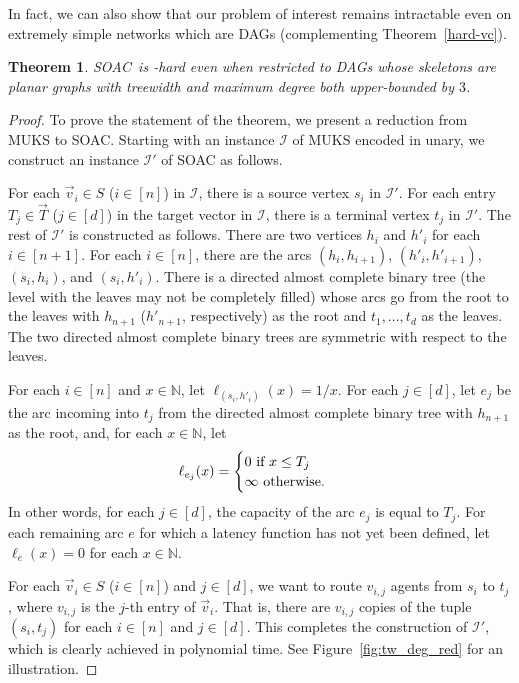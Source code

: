 \documentclass[letterpaper]{article} %
\newtheorem{theorem}{Theorem}
\newcommand{\problem}{{\sc SOAC}\xspace} %
\begin{document}
In fact, we can also show that our problem of interest remains intractable even on extremely simple networks which are DAGs (complementing Theorem~\ref{hard-vc}).

\begin{theorem}
\label{hard-tw-delta}
\problem\ is \NP-hard even when restricted to DAGs whose skeletons are planar graphs with treewidth and maximum degree both upper-bounded by $3$.
\end{theorem}

\begin{proof}
To prove the statement of the theorem, we present a reduction from \textsc{MUKS} to \problem.
Starting with an instance $\mathcal{I}$ of \textsc{MUKS} encoded in unary, we construct an instance $\mathcal{I}'$ of \problem{} as follows.

For each $\vec v_i \in S$ ($i\in [n]$) in $\mathcal{I}$, there is a source vertex $s_i$ in $\mathcal{I}'$.
For each entry $T_j\in \vec T$ ($j\in [d]$) in the target vector in $\mathcal{I}$, there is a terminal vertex $t_j$ in $\mathcal{I}'$.
The rest of $\mathcal{I}'$ is constructed as follows.
There are two vertices $h_i$ and $h'_i$ for each $i\in [n+1]$.
For each $i\in [n]$, there are the arcs $(h_i,h_{i+1})$, $(h'_i,h'_{i+1})$, $(s_i,h_i)$, and $(s_i,h'_i)$.
There is a directed almost complete binary tree (the level with the leaves may not be completely filled) whose arcs go from the root to the leaves with $h_{n+1}$ ($h'_{n+1}$, respectively) as the root and $t_1,\ldots,t_d$ as the leaves.
The two directed almost complete binary trees are symmetric with respect to the leaves.

For each $i\in [n]$ and $x\in \mathbb{N}$, let $\ell_{(s_i,h'_i)}(x) = 1/x$. 
For each $j\in [d]$, let $e_j$ be the arc incoming into $t_j$ from the directed almost complete binary tree with $h_{n+1}$ as the root, and, for each $x\in \mathbb{N}$, let
\[
\ell_{e_j}(x) = 
\begin{cases} 
	0 $ if $ x \leq T_j \\
	\infty $ otherwise$.
\end{cases}
\]
In other words, for each $j\in [d]$, the capacity of the arc $e_j$ is equal to $T_j$.
For each remaining arc $e$ for which a latency function has not yet been defined, let $\ell_{e}(x) = 0$ for each $x\in \mathbb{N}$.

For each $\vec v_i \in S$ ($i\in [n]$) and $j\in [d]$, we want to route $v_{i,j}$ agents from $s_i$ to $t_j$, where $v_{i,j}$ is the $j$-th entry of $\vec v_i$.
That is, there are $v_{i,j}$ copies of the tuple $(s_i, t_j)$ for each $i\in [n]$ and $j\in [d]$.
This completes the construction of $\mathcal{I}'$, which is clearly achieved in polynomial time.
See Figure~\ref{fig:tw_deg_red} for an illustration.


\end{proof}
\end{document}
